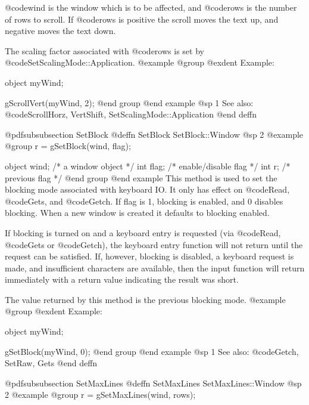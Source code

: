 @code{wind} is the window which is to be affected, and @code{rows} is the
number of rows to scroll.  If @code{rows} is positive the scroll moves
the text up, and negative moves the text down.

The scaling factor associated with @code{rows} is set by
@code{SetScalingMode::Application}.
@example
@group
@exdent Example:

object  myWind;

gScrollVert(myWind, 2);
@end group
@end example
@sp 1
See also:  @code{ScrollHorz, VertShift, SetScalingMode::Application}
@end deffn










@pdfsubsubsection {SetBlock}
@deffn {SetBlock} SetBlock::Window
@sp 2
@example
@group
r = gSetBlock(wind, flag);

object  wind;   /*  a window object     */
int     flag;   /*  enable/disable flag */
int     r;      /*  previous flag       */
@end group
@end example
This method is used to set the blocking mode associated with keyboard
IO.  It only has effect on @code{Read}, @code{Gets}, and @code{Getch}.
If flag is 1, blocking is enabled, and 0 disables blocking.  When a
new window is created it defaults to blocking enabled.

If blocking is turned on and a keyboard entry is requested (via
@code{Read}, @code{Gets} or @code{Getch}), the keyboard entry function
will not return until the request can be satisfied.  If, however,
blocking is disabled, a keyboard request is made, and insufficient
characters are available, then the input function will return immediately
with a return value indicating the result was short.

The value returned by this method is the previous blocking mode.
@example
@group
@exdent Example:

object  myWind;

gSetBlock(myWind, 0);
@end group
@end example
@sp 1
See also:  @code{Getch, SetRaw, Gets}
@end deffn















@pdfsubsubsection {SetMaxLines}
@deffn {SetMaxLines} SetMaxLines::Window
@sp 2
@example
@group
r = gSetMaxLines(wind, rows);

